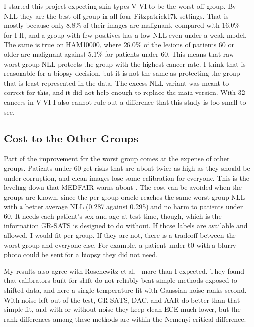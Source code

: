 \documentclass[sigconf,nonacm]{acmart}
\begin{document}
I started this project expecting skin types V-VI to be the worst-off group. By NLL they are the best-off group in all four Fitzpatrick17k settings. That is mostly because only 8.8\% of their images are malignant, compared with 16.0\% for I-II, and a group with few positives has a low NLL even under a weak model. The same is true on HAM10000, where 26.0\% of the lesions of patients 60 or older are malignant against 5.1\% for patients under 60. This means that raw worst-group NLL protects the group with the highest cancer rate. I think that is reasonable for a biopsy decision, but it is not the same as protecting the group that is least represented in the data. The excess-NLL variant was meant to correct for this, and it did not help enough to replace the main version. With 32 cancers in V-VI I also cannot rule out a difference that this study is too small to see.

\subsection{Cost to the Other Groups}

Part of the improvement for the worst group comes at the expense of other groups. Patients under 60 get risks that are about twice as high as they should be under corruption, and clean images lose some calibration for everyone. This is the leveling down that MEDFAIR warns about \cite{zong2023medfair}. The cost can be avoided when the groups are known, since the per-group oracle reaches the same worst-group NLL with a better average NLL (0.287 against 0.295) and no harm to patients under 60. It needs each patient's sex and age at test time, though, which is the information GR-SATS is designed to do without. If those labels are available and allowed, I would fit per group. If they are not, there is a tradeoff between the worst group and everyone else. For example, a patient under 60 with a blurry photo could be sent for a biopsy they did not need.

My results also agree with Roschewitz et al.\ \cite{roschewitz2025where} more than I expected. They found that calibrators built for shift do not reliably beat simple methods exposed to shifted data, and here a single temperature fit with Gaussian noise ranks second. With noise left out of the test, GR-SATS, DAC, and AAR do better than that simple fit, and with or without noise they keep clean ECE much lower, but the rank differences among these methods are within the Nemenyi critical difference.
\end{document}
